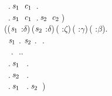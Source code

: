 \begin{holmath}
\,\,\,.\,\ensuremath{\HOLBoundVar{s}\sb{\mathrm{1}}}\,\,\,\ensuremath{\HOLBoundVar{c}\sb{\mathrm{1}}}\,\,\HOLSymConst{\HOLTokenIn{}}\,.\,\HOLSymConst{\HOLTokenConj{}}\\
\,\,\,.\,\ensuremath{\HOLBoundVar{s}\sb{\mathrm{1}}}\,\,\,\ensuremath{\HOLBoundVar{c}\sb{\mathrm{1}}}\,\,\HOLSymConst{=}\,.\,\ensuremath{\HOLBoundVar{s}\sb{\mathrm{2}}}\,\,\,\ensuremath{\HOLBoundVar{c}\sb{\mathrm{2}}}\,)\,\HOLSymConst{\HOLTokenConj{}}\\
(\HOLSymConst{\HOLTokenForall{}}(\ensuremath{\HOLBoundVar{s}\sb{\mathrm{1}}} :\ensuremath{\delta})\,(\ensuremath{\HOLBoundVar{s}\sb{\mathrm{2}}} :\ensuremath{\delta})\,( :\ensuremath{\zeta})\,( :\ensuremath{\gamma})\,( :\ensuremath{\beta}).\\
\,\,\,\ensuremath{\HOLBoundVar{s}\sb{\mathrm{1}}}\,\HOLSymConst{\HOLTokenIn{}}\,.\,\HOLSymConst{\HOLTokenConj{}}\,\ensuremath{\HOLBoundVar{s}\sb{\mathrm{2}}}\,\HOLSymConst{\HOLTokenIn{}}\,.\,\HOLSymConst{\HOLTokenConj{}}\,\,\HOLSymConst{\HOLTokenIn{}}\,.\,\HOLSymConst{\HOLTokenConj{}}\\
\,\,\,\,\HOLSymConst{\HOLTokenIn{}}\,.\,\HOLSymConst{\HOLTokenConj{}}\,\,\HOLSymConst{\HOLTokenIn{}}\,..\,\HOLSymConst{\HOLTokenImp{}}\\
\,\,\,.\,\ensuremath{\HOLBoundVar{s}\sb{\mathrm{1}}}\,\,\,\,\HOLSymConst{\HOLTokenIn{}}\,.\,\HOLSymConst{\HOLTokenConj{}}\\
\,\,\,.\,\ensuremath{\HOLBoundVar{s}\sb{\mathrm{2}}}\,\,\,\,\HOLSymConst{\HOLTokenIn{}}\,.\,\HOLSymConst{\HOLTokenConj{}}\\
\,\,\,.\,\ensuremath{\HOLBoundVar{s}\sb{\mathrm{1}}}\,\,\,\,\HOLSymConst{=}\,.\,\ensuremath{\HOLBoundVar{s}\sb{\mathrm{2}}}\,\,\,)\,\HOLSymConst{\HOLTokenConj{}}\\

\end{holmath}
